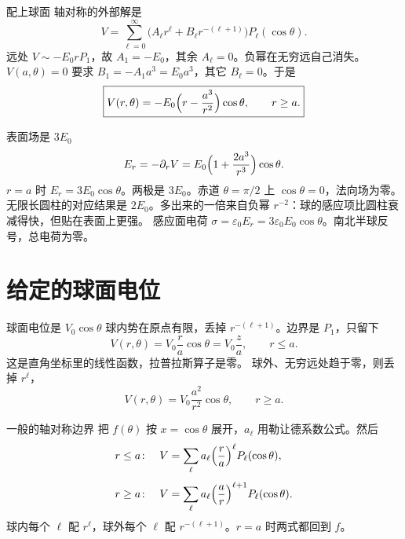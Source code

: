 \documentclass[fontset=windows, chinese, 10pt, xcolor=dvipsnames]{beamer}
\begin{document}
\begin{frame}{配上球面}
  轴对称的外部解是
  \[
    V=\sum_{\ell=0}^{\infty}
      \bigl(A_{\ell}r^{\ell}+B_{\ell}r^{-(\ell+1)}\bigr)P_{\ell}(\cos\theta).
  \]
  远处 $V\sim -E_0 r P_1$，故 $A_1=-E_0$，其余 $A_{\ell}=0$。负幂在无穷远自己消失。
  \vspace{0.3em}
  $V(a,\theta)=0$ 要求 $B_1=-A_1 a^3=E_0 a^3$，其它 $B_{\ell}=0$。于是
  \begin{equation*}
    \boxed{\displaystyle
      V(r,\theta)
      =-E_0\Bigl(r-\frac{a^3}{r^2}\Bigr)\cos\theta,
      \qquad r\geq a.}
  \end{equation*}
\end{frame}

\begin{frame}{表面场是 $3E_0$}
  \[
    E_r=-\partial_r V
    =E_0\Bigl(1+\frac{2a^3}{r^3}\Bigr)\cos\theta.
  \]
  $r=a$ 时 $E_r=3E_0\cos\theta$。两极是 $3E_0$。赤道 $\theta=\pi/2$ 上 $\cos\theta=0$，法向场为零。
  \vspace{0.35em}
  无限长圆柱的对应结果是 $2E_0$。多出来的一倍来自负幂 $r^{-2}$：球的感应项比圆柱衰减得快，但贴在表面上更强。
  \vspace{0.3em}
  感应面电荷 $\sigma=\varepsilon_0 E_r=3\varepsilon_0 E_0\cos\theta$。南北半球反号，总电荷为零。
\end{frame}

\section{给定的球面电位}

\begin{frame}{球面电位是 $V_0\cos\theta$}
  球内势在原点有限，丢掉 $r^{-(\ell+1)}$。边界是 $P_1$，只留下
  \[
    V(r,\theta)=V_0\frac{r}{a}\cos\theta=V_0\frac{z}{a},
    \qquad r\leq a.
  \]
  这是直角坐标里的线性函数，拉普拉斯算子是零。
  \vspace{0.4em}
  球外、无穷远处趋于零，则丢掉 $r^{\ell}$，
  \[
    V(r,\theta)=V_0\frac{a^2}{r^2}\cos\theta,
    \qquad r\geq a.
  \]
\end{frame}

\begin{frame}{一般的轴对称边界}
  把 $f(\theta)$ 按 $x=\cos\theta$ 展开，$a_{\ell}$ 用勒让德系数公式。然后
  \begin{align*}
    r\leq a&\colon&
      V&=\sum_{\ell}a_{\ell}\Bigl(\frac{r}{a}\Bigr)^{\ell}P_{\ell}(\cos\theta),\\[4pt]
    r\geq a&\colon&
      V&=\sum_{\ell}a_{\ell}\Bigl(\frac{a}{r}\Bigr)^{\ell+1}P_{\ell}(\cos\theta).
  \end{align*}
  球内每个 $\ell$ 配 $r^{\ell}$，球外每个 $\ell$ 配 $r^{-(\ell+1)}$。$r=a$ 时两式都回到 $f$。
\end{frame}
\end{document}
